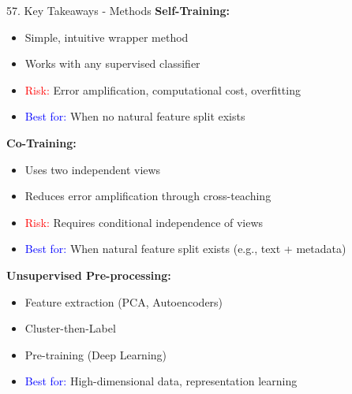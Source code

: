 \documentclass[8pt]{beamer}
\begin{document}
	\begin{frame}{57. Key Takeaways - Methods}
		\fontsize{6.5}{7.5}\selectfont
		\textbf{Self-Training:}
		\begin{itemize}
			\item Simple, intuitive wrapper method
			\item Works with any supervised classifier
			\item \textcolor{red}{Risk:} Error amplification, computational cost, overfitting
			\item \textcolor{blue}{Best for:} When no natural feature split exists
		\end{itemize}
		
		\textbf{Co-Training:}
		\begin{itemize}
			\item Uses two independent views
			\item Reduces error amplification through cross-teaching
			\item \textcolor{red}{Risk:} Requires conditional independence of views
			\item \textcolor{blue}{Best for:} When natural feature split exists (e.g., text + metadata)
		\end{itemize}
		
		\textbf{Unsupervised Pre-processing:}
		\begin{itemize}
			\item Feature extraction (PCA, Autoencoders)
			\item Cluster-then-Label
			\item Pre-training (Deep Learning)
			\item \textcolor{blue}{Best for:} High-dimensional data, representation learning
		\end{itemize}
	\end{frame}
	
\end{document}
